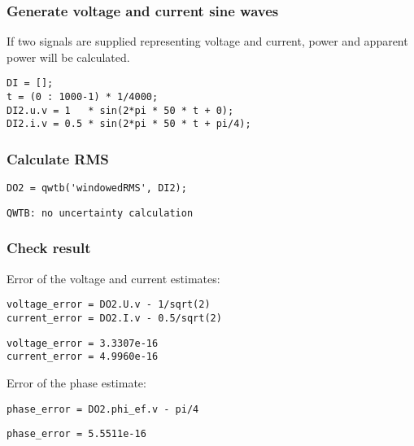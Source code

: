 \subsubsection*{Generate voltage and current sine waves}



If two signals are supplied representing voltage and current, power and
apparent power will be calculated.

\begin{lstlisting}
DI = [];
t = (0 : 1000-1) * 1/4000;
DI2.u.v = 1   * sin(2*pi * 50 * t + 0);
DI2.i.v = 0.5 * sin(2*pi * 50 * t + pi/4);
\end{lstlisting}


{}
\subsubsection*{Calculate RMS}

\begin{lstlisting}
DO2 = qwtb('windowedRMS', DI2);
\end{lstlisting}
\begin{lstlisting}[language={},xleftmargin=5pt,frame=none]
QWTB: no uncertainty calculation

\end{lstlisting}


{}
\subsubsection*{Check result}



Error of the voltage and current estimates:

\begin{lstlisting}
voltage_error = DO2.U.v - 1/sqrt(2)
current_error = DO2.I.v - 0.5/sqrt(2)
\end{lstlisting}
\begin{lstlisting}[language={},xleftmargin=5pt,frame=none]
voltage_error = 3.3307e-16
current_error = 4.9960e-16

\end{lstlisting}


Error of the phase estimate:

\begin{lstlisting}
phase_error = DO2.phi_ef.v - pi/4
\end{lstlisting}
\begin{lstlisting}[language={},xleftmargin=5pt,frame=none]
phase_error = 5.5511e-16

\end{lstlisting}


\stopcontents[localtoc]
